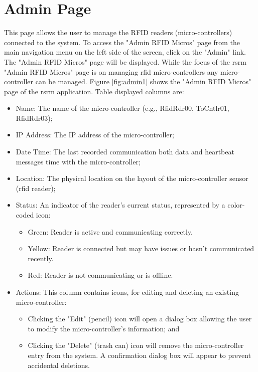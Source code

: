 \section{Admin Page}
This page allows the user to manage the RFID readers (micro-controllers) connected to the system. To access the "Admin RFID Micros" page 
from the main navigation menu on the left side of the screen, click on the "Admin" link. The "Admin RFID Micros" page will be displayed. 
While the focus of the \gls{rsrm} "Admin RFID Micros" page is on managing \gls{rfid} micro-controllers any micro-controller can be managed.
Figure \ref{fig:admin1} shows the "Admin RFID Micros" page of the \gls{rsrm} application. Table displayed columns are:
\begin{itemize}
    \item Name: The name of the micro-controller (e.g., RfidRdr00, ToCntlr01, RfidRdr03);
    \item IP Address: The IP address of the micro-controller;
    \item Date Time: The last recorded communication both data and heartbeat messages time with the micro-controller;
    \item Location: The physical location on the layout of the micro-controller sensor (\gls{rfid} reader);
    \item Status: An indicator of the reader's current status, represented by a color-coded icon:
    \begin{itemize}
        \item Green: Reader is active and communicating correctly.
        \item Yellow: Reader is connected but may have issues or hasn't communicated recently.
        \item Red: Reader is not communicating or is offline.
    \end{itemize}
    \item Actions: This column contains icons, for editing and deleting an existing micro-controller:
    \begin{itemize}
        \item Clicking the "Edit" (pencil) icon will open a dialog box allowing the user to modify the micro-controller's information; and
        \item Clicking the "Delete" (trash can) icon will remove the micro-controller entry from the system. A confirmation dialog box will 
        appear to prevent accidental deletions.
    \end{itemize}
\end{itemize}

